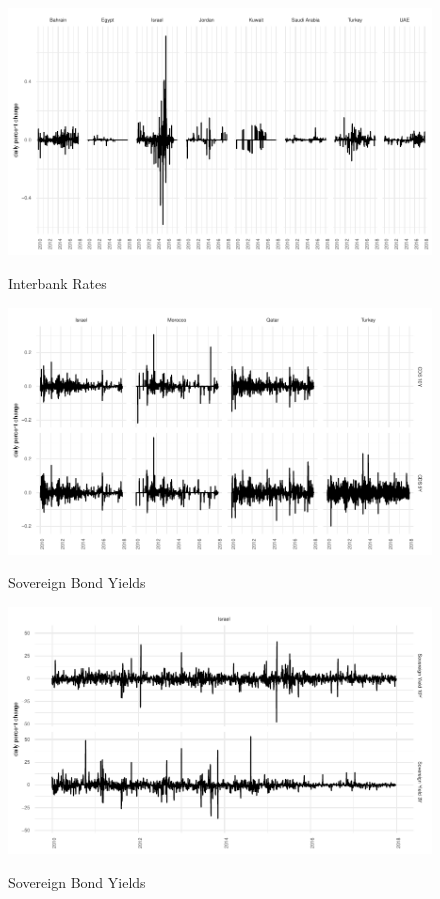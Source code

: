 \documentclass[a4paper]{article}
\begin{document}
\begin{figure}[H]
	\centering
	\caption{Interbank Rates}
	\includegraphics{interbank_transformed}
	\label{figure:interbanktransformed} 
\end{figure}

\begin{figure}[H]
	\centering
	\caption{Sovereign Bond Yields}
	\includegraphics{cds_transformed}
	\label{figure:cdstransformed} 
\end{figure}

\begin{figure}[H]
	\centering
	\caption{Sovereign Bond Yields}
	\includegraphics{sovereign_yield_transformed}
	\label{figure:sovereignstransformed} 
\end{figure}
\end{document}
